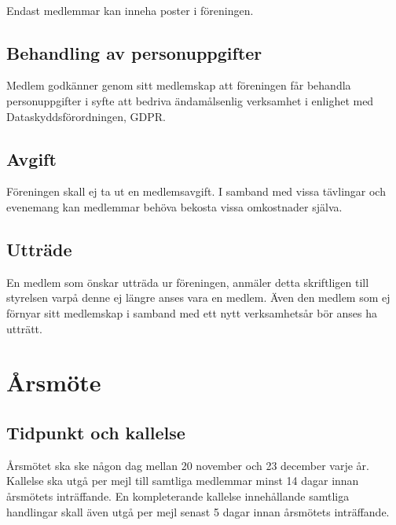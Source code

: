 \documentclass[a4paper,11pt]{article}
\begin{document}
\paragraph{}
Endast medlemmar kan inneha poster i föreningen.
%

\subsection{Behandling av personuppgifter}
Medlem godkänner genom sitt medlemskap att föreningen får behandla personuppgifter i syfte att bedriva ändamålsenlig verksamhet i enlighet med Dataskyddsförordningen, GDPR.


\subsection{Avgift}
Föreningen skall ej ta ut en medlemsavgift. I samband med vissa tävlingar och evenemang kan medlemmar behöva bekosta vissa omkostnader själva.

\subsection{Utträde}
En medlem som önskar utträda ur föreningen, anmäler detta skriftligen till styrelsen varpå denne ej längre anses vara en medlem. Även den medlem som ej förnyar sitt medlemskap i samband med ett nytt verksamhetsår bör anses ha utträtt.

\section{Årsmöte}


\subsection{Tidpunkt och kallelse}
\label{sec:arsmote:kallelse}
Årsmötet ska ske någon dag mellan 20 november och 23 december varje år. Kallelse ska utgå per mejl till samtliga medlemmar minst 14 dagar innan årsmötets inträffande. En kompleterande kallelse innehållande samtliga handlingar skall även utgå per mejl senast 5 dagar innan årsmötets inträffande.
\end{document}
